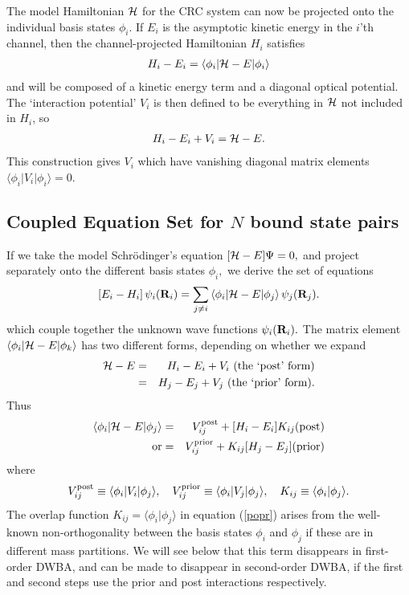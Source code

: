 \documentclass[11pt,a4paper]{article}
\newcommand{\vecR}{{\bf R}}
\begin{document}
The model Hamiltonian ${\cal H}$ for the CRC system can now be projected
onto the individual basis states $\phi_i$. If $ E_i$
is the asymptotic kinetic energy in the $i$'th channel, then the
channel-projected Hamiltonian $ H_i $ satisfies
\begin{eqnarray}
H_i - E_i =\langle\phi_i | {\cal H} - E |\phi_i\rangle
\end{eqnarray}
and will be composed of a kinetic energy term and a diagonal optical
potential.  The `interaction potential' $V_i$ is then
defined to be everything in ${\cal H}$ not included in $ H_i$, so
\begin{eqnarray}
H_i - E_i + V_i = {\cal H} - E .
\end{eqnarray}
This construction gives $ V_i$ which have vanishing diagonal matrix
elements $\langle\phi_i | V_i |\phi_i\rangle = 0 $.
\subsection{Coupled Equation Set for $N$ bound state pairs}

If we take the model Schr\"odinger's equation
$ [ {\cal H} - E ]\Psi = 0, $ and project separately onto the
different basis states $\phi_i , $ we derive the set of equations
\begin{eqnarray} \label{CRC1}
\left [ E_i - H_i \right ]\psi_i ( \vecR_i ) =
   \sum _ {j \neq i}
         \left\langle\phi_i | {\cal H}-E |\phi_j \right\rangle
         \psi_j ( \vecR_j ) .
\end{eqnarray}
which couple together the unknown wave functions $\psi_i (\vecR_i).$
The matrix element $\langle\phi_i | {\cal H} - E |\phi_k\rangle $
has two different forms, depending on whether we expand
\begin{eqnarray}
{\cal H} - E & =& H_i - E_i + V_i \mbox{ (the `post' form)} \nonumber \\
             & =& H_j - E_j + V_j \mbox{ (the `prior' form)}.\nonumber
\end{eqnarray}
Thus
\begin{eqnarray} \label{popr}
 \left\langle\phi_i | {\cal H} - E |\phi_j \right\rangle & = &
   V_{ij}^{\rm post} + [H_i - E_i ] K_{ij} {\rm (post)} \\
  {\rm or } & =& V_{ij}^{\rm prior} + K_{ij} [H_j - E_j ]
                      {\rm (prior)}  \nonumber
\end{eqnarray}
where
\begin{eqnarray}
  V_{ij}^{\rm post}  \equiv\langle\phi_i | V_i |\phi_j\rangle , ~~~
   V_{ij}^{\rm prior}   \equiv\langle\phi_i | V_j |\phi_j\rangle , ~~~
   K_{ij}              \equiv\langle\phi_i | \phi_j\rangle .
\end{eqnarray}
The overlap function $K_{ij} =\langle\phi_i |\phi_j\rangle $ in
equation (\ref{popr}) arises from the well-known non-orthogonality between the
basis states $\phi_i $ and $\phi_j $ if these are in
different mass partitions. We will see below that this term disappears in
first-order DWBA, and can be made to disappear in second-order DWBA, if
the first and second steps use the prior and post interactions
respectively.
\end{document}
